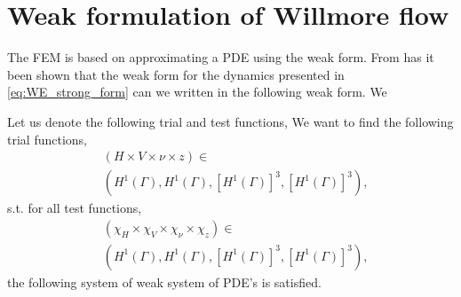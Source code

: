 \section{Weak formulation of Willmore flow}%
\label{sub:weak_formulation}

The FEM is based on approximating a PDE using the weak form.
From \cite{kovacs2021convergent} has it been shown that the weak form for the dynamics presented in \eqref{eq:WE_strong_form} can we written in the following weak form. We

Let us denote the following trial and test functions,
We want to find the following trial functions,
\[
    \begin{split}
& ( H \times V \times \nu  \times z ) \in \\
&\left( H^{1}\left( \Gamma  \right), H^1 \left( \Gamma  \right), \left[ H^{1} \left( \Gamma  \right)  \right] ^3, \left[ H^{1}\left( \Gamma  \right)  \right]^3   \right),
    \end{split}
\]
s.t. for all test functions,
\[
    \begin{split}
& ( \chi_{H}  \times \chi _{V} \times \chi _{\nu }  \times \chi _{z} ) \in \\
 &\left( H^{1}\left( \Gamma  \right), H^1 \left( \Gamma  \right), \left[ H^{1} \left( \Gamma  \right)  \right] ^3, \left[ H^{1}\left( \Gamma  \right)  \right]^3   \right),
    \end{split}
\]
the following system of weak system of PDE's is satisfied.

